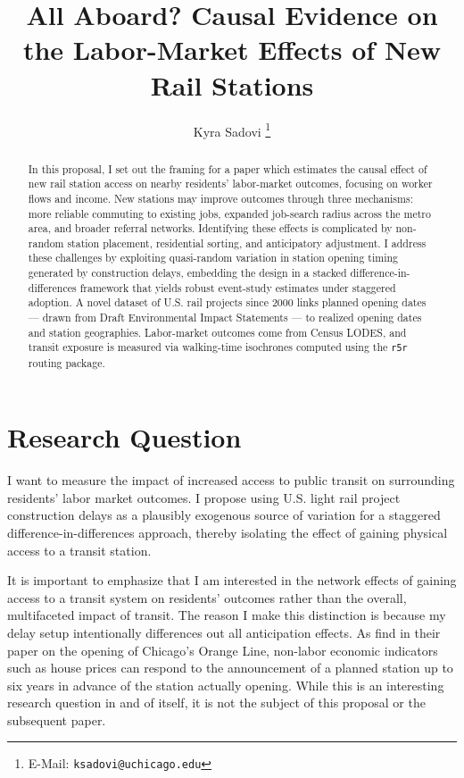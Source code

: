 \documentclass[12pt]{article}
\title{\textbf{All Aboard? Causal Evidence on the Labor-Market Effects of New Rail Stations}}
\author{Kyra Sadovi%
  \thanks{E-Mail: \texttt{ksadovi@uchicago.edu}}}
\affil{Harris School of Public Policy, University of Chicago}
\date{}
\begin{document}
\maketitle
\thispagestyle{empty}
 \begin{abstract}
     In this proposal, I set out the framing for a paper which estimates the causal effect of new rail station access on nearby residents' labor-market outcomes, focusing on worker flows and income. New stations may improve outcomes through three mechanisms: more reliable commuting to existing jobs, expanded job-search radius across the metro area, and broader referral networks. Identifying these effects is complicated by non-random station placement, residential sorting, and anticipatory adjustment. I address these challenges by exploiting quasi-random variation in station opening timing generated by construction delays, embedding the design in a stacked difference-in-differences framework that yields robust event-study estimates under staggered adoption. A novel dataset of U.S. rail projects since 2000 links planned opening dates — drawn from Draft Environmental Impact Statements — to realized opening dates and station geographies. Labor-market outcomes come from Census LODES, and transit exposure is measured via walking-time isochrones computed using the \texttt{r5r} routing package.
 \end{abstract}
\newpage 
\section{Research Question}
I want to measure the impact of increased access to public transit on surrounding residents' labor market outcomes. I propose using U.S. light rail project construction delays as a plausibly exogenous source of variation for a staggered difference-in-differences approach, thereby isolating the effect of gaining physical access to a transit station. 

It is important to emphasize that I am interested in the network effects of gaining access to a transit system on residents' outcomes rather than the overall, multifaceted impact of transit. The reason I make this distinction is because my delay setup intentionally differences out all anticipation effects. As \textcite{mcmillenReactionHousePrices2004} find in their paper on the opening of Chicago's Orange Line, non-labor economic indicators such as house prices can respond to the announcement of a planned station up to six years in advance of the station actually opening. While this is an interesting research question in and of itself, it is not the subject of this proposal or the subsequent paper. 
\end{document}
